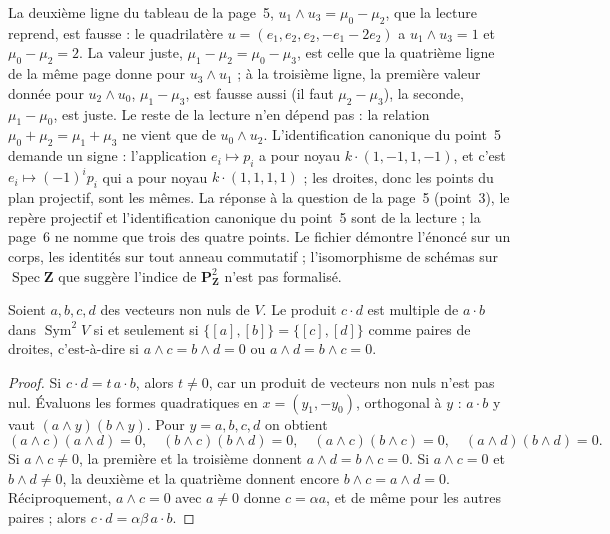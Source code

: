 \begin{remarque}
La deuxième ligne du tableau de la page~5, $u_1 \wedge u_3 = \mu_0 - \mu_2$, que la lecture reprend, est fausse : le quadrilatère $u = (e_1, e_2, e_2, -e_1 - 2e_2)$ a $u_1 \wedge u_3 = 1$ et $\mu_0 - \mu_2 = 2$. La valeur juste, $\mu_1 - \mu_2 = \mu_0 - \mu_3$, est celle que la quatrième ligne de la même page donne pour $u_3 \wedge u_1$ ; à la troisième ligne, la première valeur donnée pour $u_2 \wedge u_0$, $\mu_1 - \mu_3$, est fausse aussi (il faut $\mu_2 - \mu_3$), la seconde, $\mu_1 - \mu_0$, est juste. Le reste de la lecture n'en dépend pas : la relation $\mu_0 + \mu_2 = \mu_1 + \mu_3$ ne vient que de $u_0 \wedge u_2$. L'identification canonique du point~5 demande un signe : l'application $e_i \mapsto p_i$ a pour noyau $k\cdot(1,-1,1,-1)$, et c'est $e_i \mapsto (-1)^ip_i$ qui a pour noyau $k\cdot(1,1,1,1)$ ; les droites, donc les points du plan projectif, sont les mêmes. La réponse à la question  de la page~5 (point~3), le repère projectif et l'identification canonique du point~5 sont de la lecture ; la page~6 ne nomme que trois des quatre points. Le fichier démontre l'énoncé sur un corps, les identités sur tout anneau commutatif ; l'isomorphisme de schémas sur $\operatorname{Spec}\mathbf{Z}$ que suggère l'indice de $\mathbf{P}^2_{\mathbf{Z}}$ n'est pas formalisé.
\end{remarque}

\begin{lemme}\label{lem:73-paire}
Soient $a, b, c, d$ des vecteurs non nuls de $V$. Le produit $c \cdot d$ est multiple de $a \cdot b$ dans $\operatorname{Sym}^2 V$ si et seulement si $\{[a], [b]\} = \{[c], [d]\}$ comme paires de droites, c'est-à-dire si $a \wedge c = b \wedge d = 0$ ou $a \wedge d = b \wedge c = 0$.
\end{lemme}

\begin{proof}
Si $c \cdot d = t\,a \cdot b$, alors $t \neq 0$, car un produit de vecteurs non nuls n'est pas nul. Évaluons les formes quadratiques en $x = (y_1, -y_0)$, orthogonal à $y$ : $a \cdot b$ y vaut $(a \wedge y)(b \wedge y)$. Pour $y = a, b, c, d$ on obtient
\[ (a \wedge c)(a \wedge d) = 0, \quad (b \wedge c)(b \wedge d) = 0, \quad (a \wedge c)(b \wedge c) = 0, \quad (a \wedge d)(b \wedge d) = 0 . \]
Si $a \wedge c \neq 0$, la première et la troisième donnent $a \wedge d = b \wedge c = 0$. Si $a \wedge c = 0$ et $b \wedge d \neq 0$, la deuxième et la quatrième donnent encore $b \wedge c = a \wedge d = 0$. Réciproquement, $a \wedge c = 0$ avec $a \neq 0$ donne $c = \alpha a$, et de même pour les autres paires ; alors $c \cdot d = \alpha\beta\, a \cdot b$.
\end{proof}

